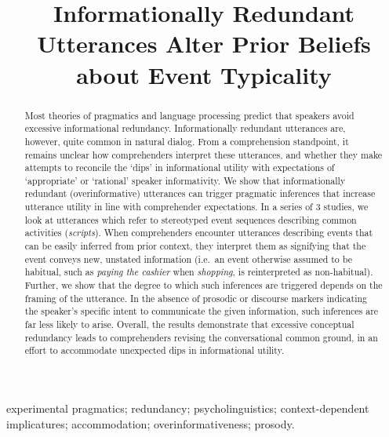 \documentclass{sp}\usepackage[]{graphicx}\usepackage[]{color}
\title[]{Informationally Redundant Utterances Alter Prior Beliefs about Event Typicality
}
\author[]{}
\newcommand{\dobib}{}
\begin{document}
\renewcommand{\dobib}{}

\maketitle

\begin{abstract}
Most theories of pragmatics and language processing predict that speakers avoid excessive informational redundancy. Informationally redundant utterances are, however, quite common in natural dialog. From a comprehension standpoint, it remains unclear how comprehenders interpret these utterances, and whether they make attempts to reconcile the `dips' in informational utility with expectations of `appropriate' or `rational' speaker informativity. We show that informationally redundant (overinformative) utterances can trigger pragmatic inferences that increase utterance utility in line with comprehender expectations. In a series of 3 studies, we look at utterances which refer to stereotyped event sequences describing common activities (\emph{scripts}). When comprehenders encounter utterances describing events that can be easily inferred from prior context, they interpret them as signifying that the event conveys new, unstated information (i.e.~an event otherwise assumed to be habitual, such as \emph{paying the cashier} when \emph{shopping}, is reinterpreted as non-habitual). Further, we show that the degree to which such inferences are triggered depends on the framing of the utterance. In the absence of prosodic or discourse markers indicating the speaker's specific intent to communicate the given information, such inferences are far less likely to arise. Overall, the results demonstrate that excessive conceptual redundancy leads to comprehenders revising the conversational common ground, in an effort to accommodate unexpected dips in informational utility.
\end{abstract}

\begin{keywords}
  experimental pragmatics; redundancy; psycholinguistics; context-dependent implicatures; accommodation; overinformativeness; prosody.
\end{keywords}

\pagebreak

\tableofcontents

\pagebreak

\listoftables

\pagebreak

\listoffigures
\end{document}

